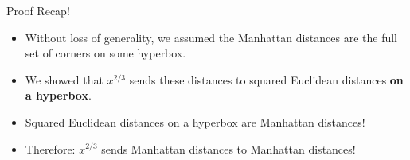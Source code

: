 %   
%   
\begin{frame}{Proof Recap!}
  \begin{itemize}
  \item Without loss of generality, we assumed the Manhattan distances
  are the full set of corners on some hyperbox.
  \item We showed that $x^{2/3}$ sends these distances to squared
  Euclidean distances \textbf{on a hyperbox}. 
  \item Squared Euclidean distances on a hyperbox are Manhattan
  distances!
  \item Therefore: $x^{2/3}$ sends Manhattan distances to Manhattan
  distances!
  \end{itemize}
\end{frame}
